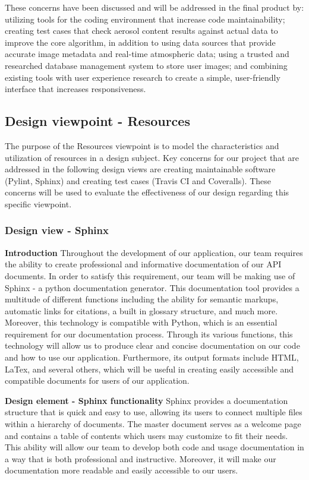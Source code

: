 \documentclass[onecolumn, draftclsnofoot,10pt, compsoc]{IEEEtran}
\begin{document}
\begin{flushleft}
\medskip

These concerns have been discussed and will be addressed in the final product by: utilizing tools for the coding environment that increase code maintainability; creating test cases that check aerosol content results against actual data to improve the core algorithm, in addition to using data sources that provide accurate image metadata and real-time atmospheric data; using a trusted and researched database management system to store user images; and combining existing tools with user experience research to create a simple, user-friendly interface that increases responsiveness.

\subsection{Design viewpoint - Resources}
The purpose of the Resources viewpoint is to model the characteristics and utilization of resources in a design subject. Key concerns for our project that are addressed in the following design views are creating maintainable software (Pylint, Sphinx) and creating test cases (Travis CI and Coveralls). These concerns will be used to evaluate the effectiveness of our design regarding this specific viewpoint.

\subsubsection{Design view - Sphinx}
\textbf{Introduction} Throughout the development of our application, our team requires the ability to create professional and informative documentation of our API documents.
In order to satisfy this requirement, our team will be making use of Sphinx - a python documentation generator. This documentation tool provides a multitude of different functions including the ability for  semantic markups, automatic links for citations, a built in glossary structure, and much more. \cite{17} Moreover, this technology is compatible with Python, which is an essential requirement for our documentation process.
Through its various functions, this technology will allow us to produce clear and concise documentation on our code and how to use our application. Furthermore, its output formats include HTML, LaTex, and several others, which will be useful in creating easily accessible and compatible documents for users of our application.

\medskip

\textbf{Design element - Sphinx functionality} Sphinx provides a documentation structure that is quick and easy to use, allowing its users to connect multiple files within a hierarchy of documents. The master document serves as a welcome page and contains a table of contents which users may customize to fit their needs. \cite{17} This ability will allow our team to develop both code and usage documentation in a way that is both professional and instructive. Moreover, it will make our documentation more readable and easily accessible to our users.


\end{flushleft}
\end{document}
